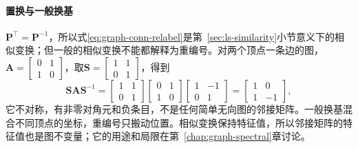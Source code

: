 \paragraph{置换与一般换基}
$\bm P^{\top}=\bm P^{-1}$，所以式\eqref{eq:graph-conn-relabel}是第~\ref{sec:ls-similarity}小节意义下的相似变换；但一般的相似变换不能都解释为重编号。对两个顶点一条边的图，$\bm A=\left[\begin{smallmatrix}0&1\\1&0\end{smallmatrix}\right]$，取$\bm S=\left[\begin{smallmatrix}1&1\\0&1\end{smallmatrix}\right]$，得到
\[
\bm S\bm A\bm S^{-1}
=\begin{bmatrix}1&1\\0&1\end{bmatrix}
\begin{bmatrix}0&1\\1&0\end{bmatrix}
\begin{bmatrix}1&-1\\0&1\end{bmatrix}
=\begin{bmatrix}1&0\\1&-1\end{bmatrix},
\]
它不对称，有非零对角元和负条目，不是任何简单无向图的邻接矩阵。一般换基混合不同顶点的坐标，重编号只搬动位置。相似变换保持特征值，所以邻接矩阵的特征值也是图不变量；它的用途和局限在第~\ref{chap:graph-spectral}章讨论。
